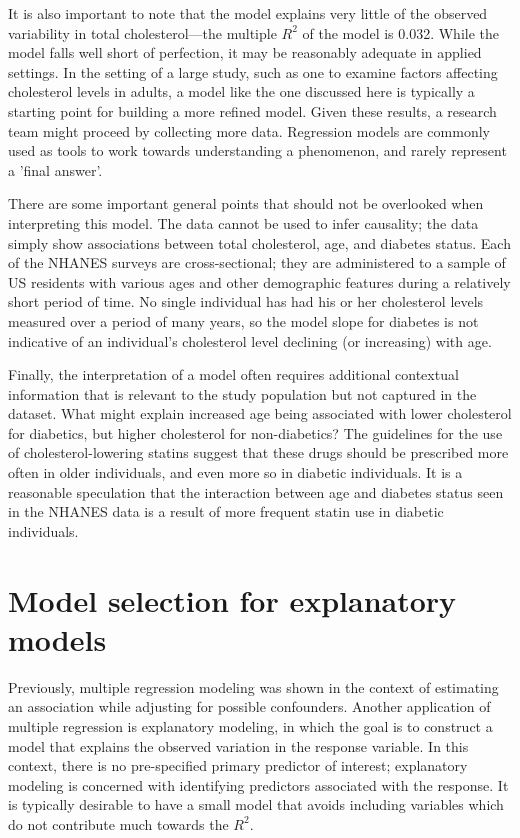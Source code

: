 It is also important to note that the model explains very little of the observed variability in total cholesterol---the multiple $R^2$ of the model is 0.032. While the model falls well short of perfection, it may be reasonably adequate in applied settings. In the setting of a large study, such as one to examine factors affecting cholesterol levels in adults, a model like the one discussed here is typically a starting point for building a more refined model. Given these results, a research team might proceed by collecting more data. Regression models are commonly used as tools to work towards understanding a phenomenon, and rarely represent a 'final answer'.

There are some important general points that should not be overlooked when interpreting this model. The data cannot be used to infer causality; the data simply show associations between total cholesterol, age, and diabetes status. Each of the NHANES surveys are cross-sectional; they are administered to a sample of US residents with various ages and other demographic features during a relatively short period of time.  No single individual has had his or her cholesterol levels measured over a period of many years, so the model slope for diabetes is not indicative of an individual's cholesterol level declining (or increasing) with age.

Finally, the interpretation of a model often requires additional contextual information that is relevant to the study population but not captured in the dataset. What might explain increased age being associated with lower cholesterol for diabetics, but higher cholesterol for non-diabetics? The guidelines for the use of cholesterol-lowering statins suggest that these drugs should be prescribed more often in older individuals, and even more so in diabetic individuals. It is a reasonable speculation that the interaction between age and diabetes status seen in the NHANES data is a result of more frequent statin use in diabetic individuals.

\newpage

\section{Model selection for explanatory models}
\label{modelSelection}


Previously, multiple regression modeling was shown in the context of estimating an association while adjusting for possible confounders. Another application of multiple regression is explanatory modeling, in which the goal is to construct a model that explains the observed variation in the response variable. In this context, there is no pre-specified primary predictor of interest; explanatory modeling is concerned with identifying predictors associated with the response. It is typically desirable to have a small model that avoids including variables which do not contribute much towards the $R^2$.

